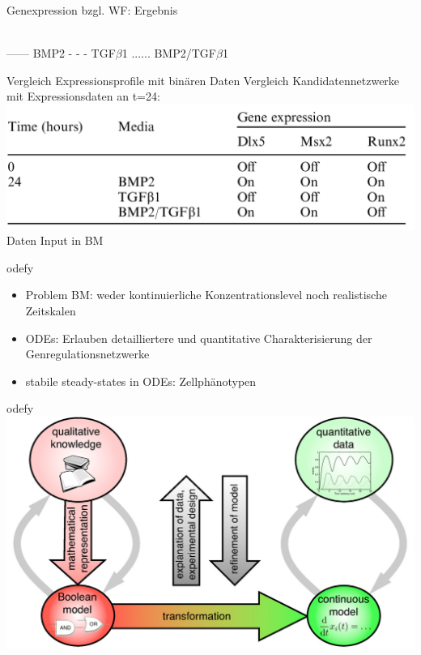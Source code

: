 \documentclass[]{beamer}
\begin{document}
\begin{frame}{Genexpression bzgl. WF: Ergebnis}
\begin{center}
	\\------ BMP2 - - - TGF$\beta$1 ...... BMP2/TGF$\beta$1
\end{center}
\end{frame}

\begin{frame}{Vergleich Expressionsprofile mit bin\"aren Daten}
Vergleich Kandidatennetzwerke mit Expressionsdaten an t=24:
\pause
\includegraphics[scale=0.25]{table1.jpg}
\pause
	\\ Daten Input in BM
\end{frame}

\begin{frame}{odefy}
\begin{itemize}
	\item Problem BM: weder kontinuierliche Konzentrationslevel noch realistische Zeitskalen
	\pause
	\item ODEs: Erlauben detailliertere und quantitative Charakterisierung der Genregulationsnetzwerke
	\pause
	\item stabile steady-states in ODEs: Zellph\"anotypen
\end{itemize}
\end{frame}

\begin{frame}{odefy}
\includegraphics[scale=0.8]{odefy.jpg}
\end{frame}
\end{document}
